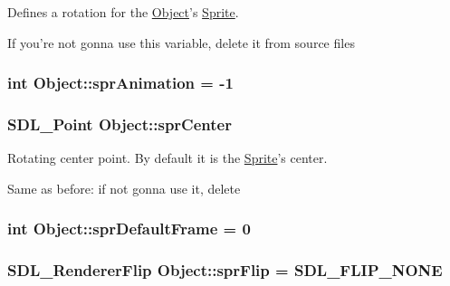 Defines a rotation for the \hyperlink{class_object}{Object}'s \hyperlink{class_sprite}{Sprite}. 

If you're not gonna use this variable, delete it from source files \hypertarget{class_object_a72bd9c2d466c47f6cd8df5e38185d432}{
\subsubsection[{spr\-Animation}]{\setlength{\rightskip}{0pt plus 5cm}int Object\-::spr\-Animation = -\/1\hspace{0.3cm}{\ttfamily [protected]}}}\label{class_object_a72bd9c2d466c47f6cd8df5e38185d432}
\hypertarget{class_object_ab5d3b1e8dbb35e139a3fd3a3b28b8610}{
\subsubsection[{spr\-Center}]{\setlength{\rightskip}{0pt plus 5cm}S\-D\-L\-\_\-\-Point Object\-::spr\-Center\hspace{0.3cm}{\ttfamily [protected]}}}\label{class_object_ab5d3b1e8dbb35e139a3fd3a3b28b8610}


Rotating center point. By default it is the \hyperlink{class_sprite}{Sprite}'s center. 

Same as before\-: if not gonna use it, delete \hypertarget{class_object_afc05c8f84fe3feb003332413f1e5ef75}{
\subsubsection[{spr\-Default\-Frame}]{\setlength{\rightskip}{0pt plus 5cm}int Object\-::spr\-Default\-Frame = 0\hspace{0.3cm}{\ttfamily [protected]}}}\label{class_object_afc05c8f84fe3feb003332413f1e5ef75}
\hypertarget{class_object_a1b77d0f13f96d477047be48ae41fb3ea}{
\subsubsection[{spr\-Flip}]{\setlength{\rightskip}{0pt plus 5cm}S\-D\-L\-\_\-\-Renderer\-Flip Object\-::spr\-Flip = S\-D\-L\-\_\-\-F\-L\-I\-P\-\_\-\-N\-O\-N\-E\hspace{0.3cm}{\ttfamily [protected]}}}\label{class_object_a1b77d0f13f96d477047be48ae41fb3ea}


